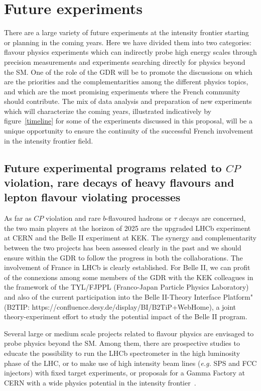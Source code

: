 
\section{Future experiments}

There are a large variety of future experiments at the intensity frontier starting or planning in the coming years. Here we have divided them into two categories:  flavour physics experiments which can indirectly probe high energy scales through precision measurements and experiments searching directly for physics beyond the SM. One of the role of the GDR will be to promote the discussions on  which are the priorities and the complementarities among the different physics topics, and which are the most promising experiments  where the French community should  contribute. The mix of data analysis and preparation of new experiments which will characterize the coming years,  illustrated indicatively by figure~\ref{timeline} for some of the experiments discussed in this proposal, will be a unique opportunity to ensure the continuity of the successful French involvement in the intensity frontier field.  


\subsection*{Future experimental programs related to $CP$ violation, rare decays of heavy flavours and lepton flavour violating processes}   

As far as $CP$ violation and rare $b$-flavoured hadrons or $\tau$ decays are concerned, the two main players at the horizon of 2025 are the  upgraded LHCb experiment at CERN and the Belle II experiment at KEK.  The synergy and complementarity between the two projects has been assessed clearly in the past and we should ensure within the GDR to follow the progress in both the collaborations. The involvement of France in LHCb is clearly established.  For Belle II, we can profit of the connexions among some members of the GDR with the KEK colleagues in the framework of the TYL/FJPPL (Franco-Japan Particle Physics Laboratory) and also of the current participation into the Belle II-Theory Interface Platform" (B2TIP: https://confluence.desy.de/display/BI/B2TiP+WebHome), a joint theory-experiment effort to study the potential impact of the Belle II program.

Several large or medium scale projects related to flavour physics are envisaged to probe physics beyond the SM. Among them, there are prospective studies to educate the possibility to run the LHCb spectrometer in the high luminosity phase of the LHC, or to make use of high intensity beam lines ({\it e.g.} SPS and FCC injectors)  with fixed target experiments, or  proposals for a Gamma Factory at CERN with a wide physics potential in the intensity frontier~\cite{Krasny:2015ffb}.

